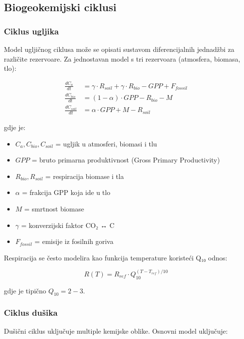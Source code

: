 \documentclass[11pt,oneside]{book}
\begin{document}
\subsection{Biogeokemijski ciklusi}

\subsubsection{Ciklus ugljika}

Model ugljičnog ciklusa može se opisati sustavom diferencijalnih jednadžbi za različite rezervoare. Za jednostavan model s tri rezervoara (atmosfera, biomasa, tlo):

\begin{align}
	\frac{dC_a}{dt} &= \gamma \cdot R_{soil} + \gamma \cdot R_{bio} - GPP + F_{fossil}\\
	\frac{dC_{bio}}{dt} &= (1-\alpha) \cdot GPP - R_{bio} - M\\
	\frac{dC_{soil}}{dt} &= \alpha \cdot GPP + M - R_{soil}
\end{align}

gdje je:
\begin{itemize}
	\item $C_a, C_{bio}, C_{soil}$ = ugljik u atmosferi, biomasi i tlu
	\item $GPP$ = bruto primarna produktivnost (Gross Primary Productivity)
	\item $R_{bio}, R_{soil}$ = respiracija biomase i tla
	\item $\alpha$ = frakcija GPP koja ide u tlo
	\item $M$ = smrtnost biomase
	\item $\gamma$ = konverzijski faktor CO₂ ↔ C
	\item $F_{fossil}$ = emisije iz fosilnih goriva
\end{itemize}

Respiracija se često modelira kao funkcija temperature koristeći Q₁₀ odnos:

\begin{equation}
	R(T) = R_{ref} \cdot Q_{10}^{(T-T_{ref})/10}
\end{equation}

gdje je tipično $Q_{10} = 2-3$.

\subsubsection{Ciklus dušika}

Dušični ciklus uključuje multiple kemijske oblike. Osnovni model uključuje:
\end{document}
